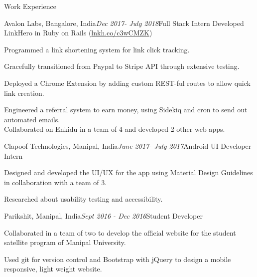 \documentclass{resume} %
\begin{document}
\begin{rSection}{Work Experience}

    \begin{rSubsection}{Avalon Labs, Bangalore, India}{\em Dec 2017- July 2018}{Full Stack Intern}{}
    Developed LinkHero in Ruby on Rails (\href{http://lnkh.co/c3wCMZK}{lnkh.co/c3wCMZK})
    \item
    Programmed a link shortening system for link click tracking.
    \item 
    Gracefully transitioned from Paypal to Stripe API through extensive testing.
    \item
    Deployed a Chrome Extension by adding custom REST-ful routes to allow quick link creation.
    \item Engineered a referral system to earn money, using Sidekiq and cron to send out automated emails. \\
    Collaborated on Enkidu in a team of 4 and developed 2 other web apps.
    \end{rSubsection}
    
    \begin{rSubsection}{Clapoof Technologies, Manipal, India}{\em June 2017- July 2017}{Android UI Developer Intern}{}
    \item Designed and developed the UI/UX for the app using Material Design Guidelines in collaboration with a team of 3.
    \item Researched about usability testing and accessibility.
    \end{rSubsection}
    
    \begin{rSubsection}{Parikshit, Manipal, India}{\em Sept 2016 - Dec 2016}{Student Developer}{}
    \item Collaborated in a team of two to develop the official website for the student satellite program of Manipal University.
    \item Used git for version control and Bootstrap with jQuery to design a mobile responsive, light weight website. 
    \end{rSubsection}
\end{rSection}
\end{document}
